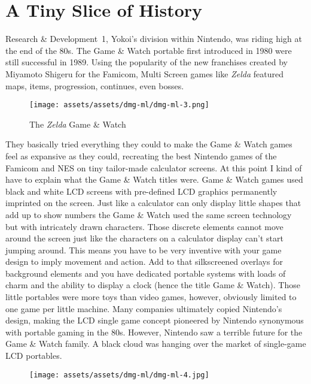\documentclass{book}
\begin{document}
\FloatBarrier\needspace{5pt}\section*{A Tiny Slice of History}\nopagebreak[4]

Research \& Development 1, Yokoi’s division within Nintendo, was riding high at the end of the 80s. The Game \& Watch portable first introduced in 1980 were still successful in 1989. Using the popularity of the new franchises created by Miyamoto Shigeru for the Famicom, Multi Screen games like \emph{Zelda} featured maps, items, progression, continues, even bosses.

\begin{figure}[hbt]
\vskip 10pt
\centering \texttt{[image: assets/assets/dmg-ml/dmg-ml-3.png]}\par\pagetwodescription The \emph{Zelda} Game \& Watch
\vskip 6pt
\end{figure}

They basically tried everything they could to make the Game \& Watch games feel as expansive as they could, recreating the best Nintendo games of the Famicom and NES on tiny tailor-made calculator screens. At this point I kind of have to explain what the Game \& Watch titles were. Game \& Watch games used black and white LCD screens with pre-defined LCD graphics permanently imprinted on the screen. Just like a calculator can only display little shapes that add up to show numbers the Game \& Watch used the same screen technology but with intricately drawn characters. Those discrete elements cannot move around the screen just like the characters on a calculator display can’t start jumping around. This means you have to be very inventive with your game design to imply movement and action. Add to that silkscreened overlays for background elements and you have dedicated portable systems with loads of charm and the ability to display a clock (hence the title Game \& Watch). Those little portables were more toys than video games, however, obviously limited to one game per little machine. Many companies ultimately copied Nintendo’s design, making the LCD single game concept pioneered by Nintendo synonymous with portable gaming in the 80s. However, Nintendo saw a terrible future for the Game \& Watch family. A black cloud was hanging over the market of single-game LCD portables.

\begin{figure}[hbt]
\vskip 10pt
\centering \texttt{[image: assets/assets/dmg-ml/dmg-ml-4.jpg]}
\vskip 6pt
\end{figure}
\end{document}
